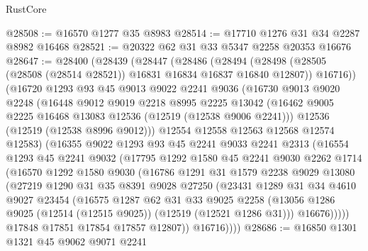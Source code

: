 \begin{lexlean}{RustCore}
\begin{coremodule}
@28508 := @16570 @1277 @35 @8983
@28514 := @17710 @1276 @31 @34 @2287 @8982 @16468
@28521 := @20322 @62 @31 @33 @5347 @2258 @20353 @16676
@28647 := @28400
    (@28439
      (@28447
        (@28486
          (@28494
            (@28498 (@28505 (@28508 (@28514 @28521)) @16831 @16834 @16837 @16840 @12807))
            @16716))
        (@16720
          @1293
          @93
          @45
          @9013
          @9022
          @2241
          @9036
          (@16730
            @9013
            @9020
            @2248
            (@16448
              @9012
              @9019
              @2218
              @8995
              @2225
              @13042
              (@16462 @9005 @2225 @16468 @13083 @12536 (@12519 (@12538 @9006 @2241)))
              @12536
              (@12519 (@12538 @8996 @9012)))
            @12554
            @12558
            @12563
            @12568
            @12574
            @12583)
          (@16355
            @9022
            @1293
            @93
            @45
            @2241
            @9033
            @2241
            @2313
            (@16554
              @1293
              @45
              @2241
              @9032
              (@17795
                @1292
                @1580
                @45
                @2241
                @9030
                @2262
                @1714
                (@16570
                  @1292
                  @1580
                  @9030
                  (@16786
                    @1291
                    @31
                    @1579
                    @2238
                    @9029
                    @13080
                    (@27219
                      @1290
                      @31
                      @35
                      @8391
                      @9028
                      @27250
                      (@23431
                        @1289
                        @31
                        @34
                        @4610
                        @9027
                        @23454
                        (@16575
                          @1287
                          @62
                          @31
                          @33
                          @9025
                          @2258
                          (@13056 @1286 @9025 (@12514 (@12515 @9025)) (@12519 (@12521 @1286 @31)))
                          @16676)))))
                @17848
                @17851
                @17854
                @17857
                @12807))
            @16716))))
@28686 := @16850
    @1301
    @1321
    @45
    @9062
    @9071
    @2241

\end{coremodule}
\end{lexlean}
